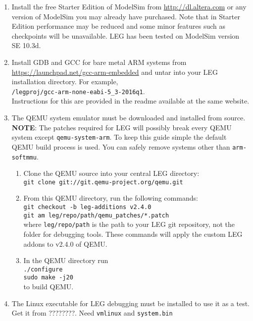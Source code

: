 \begin{enumerate}
\item Install the free Starter Edition of ModelSim from \url{http://dl.altera.com} or any version of ModelSim you may already have purchased. 
Note that in Starter Edition performance may be reduced and some minor features such as checkpoints will be unavailable. 
LEG has been tested on ModelSim version SE 10.3d. 

\item Install GDB and GCC for bare metal ARM systems from \url{https://launchpad.net/gcc-arm-embedded} and untar into your LEG installation directory. 
For example, \\\texttt{/legproj/gcc-arm-none-eabi-5\_3-2016q1}.\\
Instructions for this are provided in the readme available at the same website.

\item The QEMU system emulator must be downloaded and installed from source. 
\textbf{NOTE}: The patches required for LEG will possibly break every QEMU system except \texttt{qemu-system-arm}. 
To keep this guide simple the default QEMU build process is used. 
You can safely remove systems other than \texttt{arm-softmmu}.
	\begin{enumerate}
	\item Clone the QEMU source into your central LEG directory: \\\texttt{git clone git://git.qemu-project.org/qemu.git}
	\item From this QEMU directory, run the following commands: \\\texttt{git checkout -b leg-additions v2.4.0 \\ git am leg/repo/path/qemu\_patches/*.patch}\\
	where \texttt{leg/repo/path} is the path to your LEG git repository, not the folder for debugging tools.
	These commands will apply the custom LEG addons to v2.4.0 of QEMU.
	\item In the QEMU directory run \\\texttt{./configure \\ sudo make -j20}\\ to build QEMU.
	\end{enumerate}
	
\item The Linux executable for LEG debugging must be installed to use it as a test.
Get it from  ????????.
Need \texttt{vmlinux} and \texttt{system.bin}
\end{enumerate}

